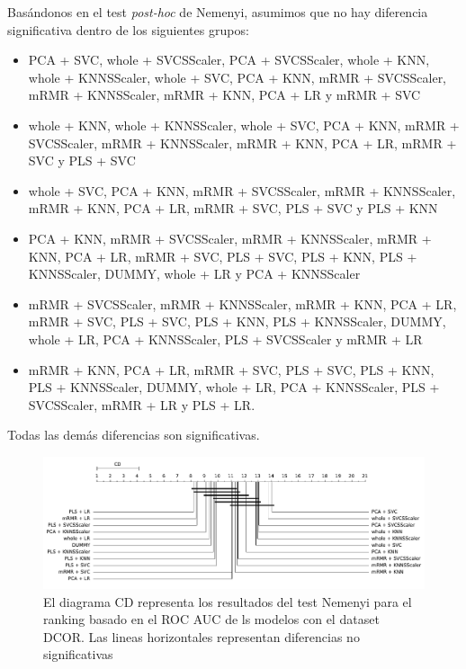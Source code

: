 \documentclass[a4paper,oneside,11pt,leqno]{article}
\begin{document}
	Basándonos en el test \textit{post-hoc} de Nemenyi, asumimos que no hay diferencia significativa dentro de los siguientes grupos:
	
	\begin{itemize}
		\item PCA + SVC, whole + SVCSScaler, PCA + SVCSScaler, whole + KNN, whole + KNNSScaler, whole + SVC, PCA + KNN, mRMR + SVCSScaler, mRMR + KNNSScaler, mRMR + KNN, PCA + LR y mRMR + SVC
		
		\item whole + KNN, whole + KNNSScaler, whole + SVC, PCA + KNN, mRMR + SVCSScaler, mRMR + KNNSScaler, mRMR + KNN, PCA + LR, mRMR + SVC y PLS + SVC
		
		\item whole + SVC, PCA + KNN, mRMR + SVCSScaler, mRMR + KNNSScaler, mRMR + KNN, PCA + LR, mRMR + SVC, PLS + SVC y PLS + KNN
		
		\item PCA + KNN, mRMR + SVCSScaler, mRMR + KNNSScaler, mRMR + KNN, PCA + LR, mRMR + SVC, PLS + SVC, PLS + KNN, PLS + KNNSScaler, DUMMY, whole + LR y PCA + KNNSScaler
		
		\item mRMR + SVCSScaler, mRMR + KNNSScaler, mRMR + KNN, PCA + LR, mRMR + SVC, PLS + SVC, PLS + KNN, PLS + KNNSScaler, DUMMY, whole + LR, PCA + KNNSScaler, PLS + SVCSScaler y mRMR + LR
		
		\item mRMR + KNN, PCA + LR, mRMR + SVC, PLS + SVC, PLS + KNN, PLS + KNNSScaler, DUMMY, whole + LR, PCA + KNNSScaler, PLS + SVCSScaler, mRMR + LR y PLS + LR. 
		
	\end{itemize}
	
	Todas las demás diferencias son significativas.
	
	\begin{figure}[h]
		\includegraphics[width=\linewidth]{stat_results_dcor.pdf}
		\caption{El diagrama CD representa los resultados del test Nemenyi para el ranking basado en el ROC AUC de ls modelos con el dataset DCOR. Las lineas horizontales representan diferencias no significativas}
		\label{fig:stats_fig_dcor}
	\end{figure}
	
\end{document}
